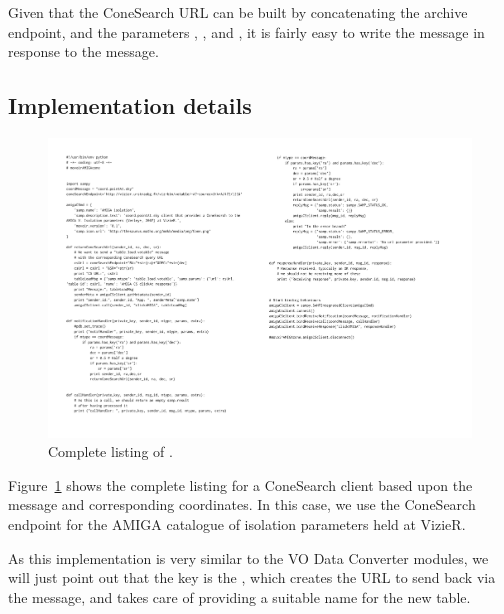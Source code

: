 		Given that the ConeSearch URL can be built by concatenating
		the archive endpoint, and the
		parameters , , and , it is
		fairly easy to write the  message
		in response to the  message.
		
		\subsection{Implementation details} %
		\label{sub:implementation_details_amigacones}
			
			\begin{figure}[tbp]
				\centering
					\includegraphics[width=\textwidth]
					{fig/movoirAMIGAcone.pdf}
				\caption[Listing of
				]
				{Complete listing of
				.}
				\label{fig:fig_movoirAMIGAcone}
			\end{figure}
			
			
			Figure~\ref{fig:fig_movoirAMIGAcone} shows the
			complete listing for a ConeSearch client based upon
			the  message and corresponding
			coordinates. In this case, we use the ConeSearch endpoint
			for the AMIGA catalogue of isolation parameters held at
			VizieR.
			
			As this implementation is very similar to the VO Data
			Converter modules, we will just point out that the
			key is the , which creates
			the URL to send back via the 
			message, and takes care of providing a suitable name for
			the new table.
			
